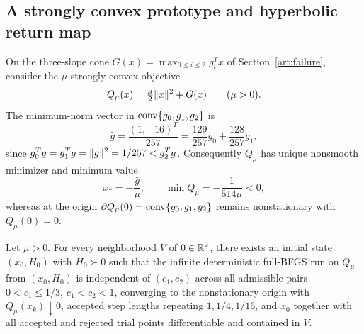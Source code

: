 \subsection{A strongly convex prototype and hyperbolic return map}

On the three-slope cone $G(x)=\max_{0\le i\le2}g_i^Tx$ of
Section~\ref{art:failure}, consider the $\mu$-strongly convex objective
\[
 Q_\mu(x)=\tfrac\mu2\lVert x\rVert^2+G(x)\qquad(\mu>0).
\]
The minimum-norm vector in $\operatorname{conv}\{g_0,g_1,g_2\}$ is
\[
 \bar g=\frac{(1,-16)^T}{257}=\frac{129}{257}g_0+\frac{128}{257}g_1,
\]
since $g_0^T\bar g=g_1^T\bar g=\lVert\bar g\rVert^2=1/257<g_2^T\bar g$. Consequently
$Q_\mu$ has unique nonsmooth minimizer and minimum value
\begin{equation}\label{art:quadratic_minimizer}
 x_*=-\frac{\bar g}{\mu},\qquad \min Q_\mu=-\frac{1}{514\mu}<0,
\end{equation}
whereas at the origin $\partial Q_\mu(0)=\operatorname{conv}\{g_0,g_1,g_2\}$ remains
nonstationary with $Q_\mu(0)=0$.

\begin{proposition}\label{art:quadratic_failure}
Let $\mu>0$. For every neighborhood $V$ of $0\in\mathbb R^2$, there exists an initial
state $(x_0,H_0)$ with $H_0\succ0$ such that the infinite deterministic
full-BFGS run on $Q_\mu$ from $(x_0,H_0)$ is independent of $(c_1,c_2)$ across
all admissible pairs $0<c_1\le1/3$, $c_1<c_2<1$, converging to the
nonstationary origin with $Q_\mu(x_k)\downarrow0$,
accepted step lengths repeating $1,1/4,1/16$, and $x_0$ together with all
accepted and rejected trial points differentiable and contained in $V$.
\end{proposition}

